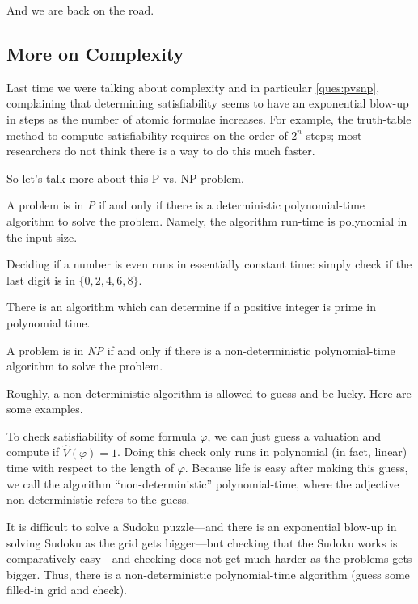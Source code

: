 \documentclass[../notes.tex]{subfiles}
\begin{document}

And we are back on the road.

\subsection{More on Complexity}
Last time we were talking about complexity and in particular \autoref{ques:pvsnp}, complaining that determining satisfiability seems to have an exponential blow-up in steps as the number of atomic formulae increases. For example, the truth-table method to compute satisfiability requires on the order of $2^n$ steps; most researchers do not think there is a way to do this much faster.

So let's talk more about this P vs. NP problem.
\begin{definition}[P]
	A problem is in \textit{P} if and only if there is a deterministic polynomial-time algorithm to solve the problem. Namely, the algorithm run-time is polynomial in the input size.
\end{definition}
\begin{example}
	Deciding if a number is even runs in essentially constant time: simply check if the last digit is in $\{0,2,4,6,8\}$.
\end{example}
\begin{example}
	There is an algorithm which can determine if a positive integer is prime in polynomial time.
\end{example}
\begin{definition}[NP]
	A problem is in \textit{NP} if and only if there is a non-deterministic polynomial-time algorithm to solve the problem.
\end{definition}
Roughly, a non-deterministic algorithm is allowed to guess and be lucky. Here are some examples.
\begin{example}
	To check satisfiability of some formula $\varphi$, we can just guess a valuation and compute if $\hat V(\varphi)=1$. Doing this check only runs in polynomial (in fact, linear) time with respect to the length of $\varphi$. Because life is easy after making this guess, we call the algorithm ``non-deterministic'' polynomial-time, where the adjective non-deterministic refers to the guess.
\end{example}
\begin{example}
	It is difficult to solve a Sudoku puzzle---and there is an exponential blow-up in solving Sudoku as the grid gets bigger---but checking that the Sudoku works is comparatively easy---and checking does not get much harder as the problems gets bigger. Thus, there is a non-deterministic polynomial-time algorithm (guess some filled-in grid and check).
\end{example}
\end{document}
